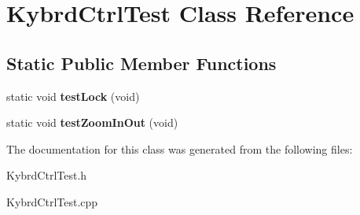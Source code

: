 \hypertarget{class_kybrd_ctrl_test}{\section{Kybrd\+Ctrl\+Test Class Reference}
\label{class_kybrd_ctrl_test}
}
\subsection*{Static Public Member Functions}
\begin{DoxyCompactItemize}
\item 
\hypertarget{class_kybrd_ctrl_test_a40328e9bbaaaf690d103b603b4b52fb2}{static void {\bfseries test\+Lock} (void)}\label{class_kybrd_ctrl_test_a40328e9bbaaaf690d103b603b4b52fb2}

\item 
\hypertarget{class_kybrd_ctrl_test_a906415c61045ff77196ffac7666b59a1}{static void {\bfseries test\+Zoom\+In\+Out} (void)}\label{class_kybrd_ctrl_test_a906415c61045ff77196ffac7666b59a1}

\end{DoxyCompactItemize}


The documentation for this class was generated from the following files\+:\begin{DoxyCompactItemize}
\item 
Kybrd\+Ctrl\+Test.\+h\item 
Kybrd\+Ctrl\+Test.\+cpp\end{DoxyCompactItemize}
